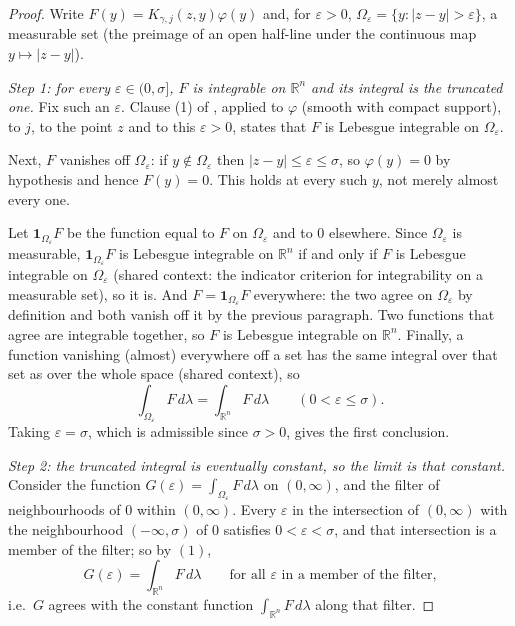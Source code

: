 \begin{proof}
Write $F(y) = K_{\gamma,j}(z,y)\varphi(y)$ and, for $\varepsilon > 0$,
$\Omega_\varepsilon = \{y : |z-y| > \varepsilon\}$, a measurable set (the preimage of an open
half-line under the continuous map $y \mapsto |z-y|$).

\emph{Step 1: for every $\varepsilon \in (0,\sigma]$, $F$ is integrable on $\mathbb{R}^n$ and
its integral is the truncated one.}
Fix such an $\varepsilon$.  Clause (1) of , applied to $\varphi$ (smooth
with compact support), to $j$, to the point $z$ and to this $\varepsilon > 0$, states that $F$
is Lebesgue integrable on $\Omega_\varepsilon$.

Next, $F$ vanishes off $\Omega_\varepsilon$: if $y \notin \Omega_\varepsilon$ then
$|z-y| \leq \varepsilon \leq \sigma$, so $\varphi(y) = 0$ by hypothesis and hence $F(y) = 0$.
This holds at every such $y$, not merely almost every one.

Let $\mathbf 1_{\Omega_\varepsilon}F$ be the function equal to $F$ on $\Omega_\varepsilon$ and
to $0$ elsewhere.  Since $\Omega_\varepsilon$ is measurable,
$\mathbf 1_{\Omega_\varepsilon}F$ is Lebesgue integrable on $\mathbb{R}^n$ if and only if $F$ is
Lebesgue integrable on $\Omega_\varepsilon$ (shared context: the indicator criterion for
integrability on a measurable set), so it is.  And
$F = \mathbf 1_{\Omega_\varepsilon}F$ everywhere: the two agree on $\Omega_\varepsilon$ by
definition and both vanish off it by the previous paragraph.  Two functions that agree are
integrable together, so $F$ is Lebesgue integrable on $\mathbb{R}^n$.  Finally, a function
vanishing (almost) everywhere off a set has the same integral over that set as over the whole
space (shared context), so
\begin{equation*}
  \int_{\Omega_\varepsilon}F\,d\lambda = \int_{\mathbb{R}^n}F\,d\lambda
  \qquad (0 < \varepsilon \leq \sigma) . \tag{1}
\end{equation*}
Taking $\varepsilon = \sigma$, which is admissible since $\sigma > 0$, gives the first
conclusion.

\emph{Step 2: the truncated integral is eventually constant, so the limit is that constant.}
Consider the function
$G(\varepsilon) = \int_{\Omega_\varepsilon}F\,d\lambda$ on $(0,\infty)$, and the filter of
neighbourhoods of $0$ within $(0,\infty)$.  Every $\varepsilon$ in the intersection of
$(0,\infty)$ with the neighbourhood $(-\infty,\sigma)$ of $0$ satisfies $0 < \varepsilon < \sigma$,
and that intersection is a member of the filter; so by $(1)$,
\[
  G(\varepsilon) = \int_{\mathbb{R}^n}F\,d\lambda
  \qquad\text{for all } \varepsilon \text{ in a member of the filter,}
\]
i.e.\ $G$ agrees with the constant function $\int_{\mathbb{R}^n}F\,d\lambda$ along that filter.


\end{proof}
